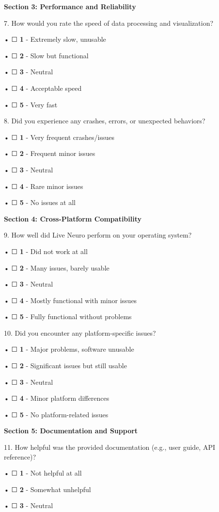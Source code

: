 \documentclass[
]{article}
\begin{document}
\textbf{Section 3: Performance and Reliability}

7. How would you rate the speed of data processing and visualization?

• ☐ \textbf{1} - Extremely slow, unusable

• ☐ \textbf{2} - Slow but functional

• ☐ \textbf{3} - Neutral

• ☐ \textbf{4} - Acceptable speed

• ☐ \textbf{5} - Very fast

8. Did you experience any crashes, errors, or unexpected behaviors?

• ☐ \textbf{1} - Very frequent crashes/issues

• ☐ \textbf{2} - Frequent minor issues

• ☐ \textbf{3} - Neutral

• ☐ \textbf{4} - Rare minor issues

• ☐ \textbf{5} - No issues at all

\textbf{Section 4: Cross-Platform Compatibility}

9. How well did Live Neuro perform on your operating system?

• ☐ \textbf{1} - Did not work at all

• ☐ \textbf{2} - Many issues, barely usable

• ☐ \textbf{3} - Neutral

• ☐ \textbf{4} - Mostly functional with minor issues

• ☐ \textbf{5} - Fully functional without problems

10. Did you encounter any platform-specific issues?

• ☐ \textbf{1} - Major problems, software unusable

• ☐ \textbf{2} - Significant issues but still usable

• ☐ \textbf{3} - Neutral

• ☐ \textbf{4} - Minor platform differences

• ☐ \textbf{5} - No platform-related issues

\textbf{Section 5: Documentation and Support}

11. How helpful was the provided documentation (e.g., user guide, API
reference)?

• ☐ \textbf{1} - Not helpful at all

• ☐ \textbf{2} - Somewhat unhelpful

• ☐ \textbf{3} - Neutral
\end{document}
